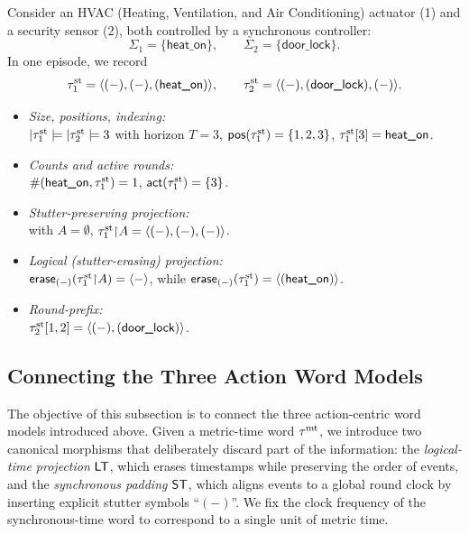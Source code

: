 \begin{example}
    Consider an HVAC (Heating, Ventilation, and Air Conditioning) actuator (1) and a security sensor (2), both controlled by a synchronous controller:
    \[
    \Sigma_1=\{\textsf{heat\_on}\},\qquad 
    \Sigma_2=\{\textsf{door\_lock}\}.
    \]
    In one episode, we record
    \[
    \tau^{\mathrm{st}}_1=\langle (-),(-),(\textsf{heat\_on}) \rangle ,\qquad
    \tau^{\mathrm{st}}_2=\langle (-),(\textsf{door\_lock}),(-) \rangle .
    \]
    
    \begin{itemize}
        \item \emph{Size, positions, indexing:}\\
    \(|\tau^{\mathrm{st}}_1|=|\tau^{\mathrm{st}}_2|=3\) with horizon \(T=3\),  
    \(\mathsf{pos}(\tau^{\mathrm{st}}_1)=\{1,2,3\}\),  
    \(\tau^{\mathrm{st}}_1[3]=\textsf{heat\_on}\).
    
        \item \emph{Counts and active rounds:}\\
    \(\#(\textsf{heat\_on},\tau^{\mathrm{st}}_1)=1\),  
    \(\mathsf{act}(\tau^{\mathrm{st}}_1)=\{3\}\).
    
        \item \emph{Stutter-preserving projection:}\\
    with \(A=\emptyset\),  
    \(\tau^{\mathrm{st}}_1{\upharpoonright}A=\langle (-),(-),(-) \rangle \).
    
        \item \emph{Logical (stutter-erasing) projection:}\\
    \(\mathsf{erase}_{(-)}(\tau^{\mathrm{st}}_1{\upharpoonright}A)=\langle - \rangle \),  
    while \(\mathsf{erase}_{(-)}(\tau^{\mathrm{st}}_1)=\langle (\textsf{heat\_on}) \rangle \).
    
        \item \emph{Round-prefix:}\\
    \(\tau^{\mathrm{st}}_2[1,2]=\langle (-),(\textsf{door\_lock}) \rangle \).
    \end{itemize}
    \end{example}
  

\subsection{Connecting the Three Action Word Models}
The objective of this subsection is to connect the three action-centric word models introduced above. Given a metric-time word \(\tau^{\mathrm{mt}}\), we introduce two canonical morphisms that deliberately discard part of the information: the \emph{logical-time projection} \(\mathsf{LT}\), which erases timestamps while preserving the order of events, and the \emph{synchronous padding} \(\mathsf{ST}\), which aligns events to a global round clock by inserting explicit stutter symbols ``\((-)\)''. We fix the clock frequency of the synchronous-time word to correspond to a single unit of metric time.

